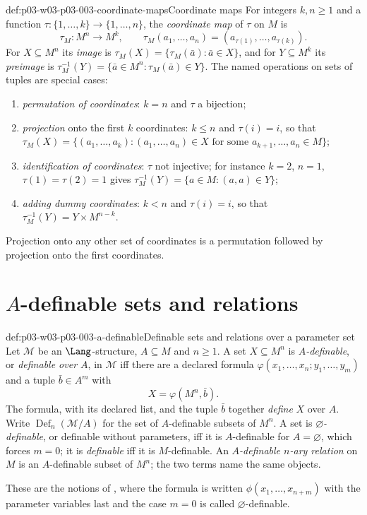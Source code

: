 \begin{hbdefinition}{def:p03-w03-p03-003-coordinate-maps}{Coordinate maps}
For integers \(k,n\geq1\) and a function
\(\tau:\{1,\ldots,k\}\to\{1,\ldots,n\}\), the \emph{coordinate map} of
\(\tau\) on \(M\) is
\[
 \tau_M:M^n\to M^k,\qquad
 \tau_M(a_1,\ldots,a_n)=(a_{\tau(1)},\ldots,a_{\tau(k)}).
\]
For \(X\subseteq M^n\) its \emph{image} is
\(\tau_M(X)=\{\tau_M(\bar a):\bar a\in X\}\), and for \(Y\subseteq M^k\) its
\emph{preimage} is
\(\tau_M^{-1}(Y)=\{\bar a\in M^n:\tau_M(\bar a)\in Y\}\).  The named
operations on sets of tuples are special cases:
\begin{enumerate}
 \item \emph{permutation of coordinates}: \(k=n\) and \(\tau\) a bijection;
 \item \emph{projection} onto the first \(k\) coordinates: \(k\leq n\) and
       \(\tau(i)=i\), so that
       \(\tau_M(X)=\{(a_1,\ldots,a_k):(a_1,\ldots,a_n)\in X
       \text{ for some }a_{k+1},\ldots,a_n\in M\}\);
 \item \emph{identification of coordinates}: \(\tau\) not injective; for
       instance \(k=2\), \(n=1\), \(\tau(1)=\tau(2)=1\) gives
       \(\tau_M^{-1}(Y)=\{a\in M:(a,a)\in Y\}\);
 \item \emph{adding dummy coordinates}: \(k<n\) and \(\tau(i)=i\), so that
       \(\tau_M^{-1}(Y)=Y\times M^{n-k}\).
\end{enumerate}
Projection onto any other set of coordinates is a permutation followed by
projection onto the first coordinates.
\end{hbdefinition}

\section{\texorpdfstring{\(A\)}{A}-definable sets and relations}
\label{sec:p03-w03-p03-003-a-definable-section}

\begin{hbdefinition}{def:p03-w03-p03-003-a-definable}{Definable sets and relations over a parameter set}
Let \(\mathcal M\) be an \(\Lang\)-structure, \(A\subseteq M\) and
\(n\geq1\).  A set \(X\subseteq M^n\) is \emph{\(A\)-definable}, or
\emph{definable over \(A\)}, in \(\mathcal M\) iff there are a declared
formula \(\varphi(x_1,\ldots,x_n;y_1,\ldots,y_m)\) and a tuple
\(\bar b\in A^m\) with
\[
 X=\varphi(M^n,\bar b).
\]
The formula, with its declared list, and the tuple \(\bar b\) together
\emph{define} \(X\) over \(A\).  Write
\(\operatorname{Def}_n(\mathcal M/A)\) for the set of \(A\)-definable subsets
of \(M^n\).  A set is \emph{\(\varnothing\)-definable}, or definable without
parameters, iff it is \(A\)-definable for \(A=\varnothing\), which forces
\(m=0\); it is \emph{definable} iff it is \(M\)-definable.  An
\emph{\(A\)-definable \(n\)-ary relation} on \(M\) is an \(A\)-definable
subset of \(M^n\); the two terms name the same objects.

These are the notions of \cite[p.~17]{Marker2000IntroductionModelTheory},
where the formula is written \(\phi(x_1,\ldots,x_{n+m})\) with the parameter
variables last and the case \(m=0\) is called \(\varnothing\)-definable.
\end{hbdefinition}


